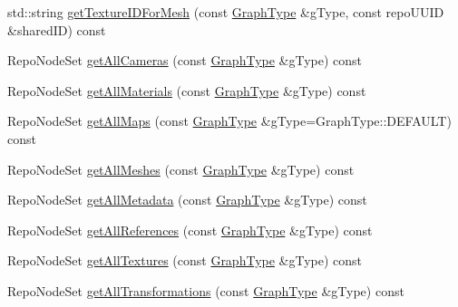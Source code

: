 \begin{DoxyCompactItemize}
std\+::string \hyperlink{classrepo_1_1core_1_1model_1_1_repo_scene_a781f11c7e9f9e561772581fbc8ecd51f}{get\+Texture\+I\+D\+For\+Mesh} (const \hyperlink{classrepo_1_1core_1_1model_1_1_repo_scene_aefcacd6eb4c7774ac1bfe3a6b223337c}{Graph\+Type} \&g\+Type, const repo\+U\+U\+I\+D \&shared\+I\+D) const 
\item 
Repo\+Node\+Set \hyperlink{classrepo_1_1core_1_1model_1_1_repo_scene_a22211b64fc734e3ad198fc3a3ba9cb8c}{get\+All\+Cameras} (const \hyperlink{classrepo_1_1core_1_1model_1_1_repo_scene_aefcacd6eb4c7774ac1bfe3a6b223337c}{Graph\+Type} \&g\+Type) const 
\item 
Repo\+Node\+Set \hyperlink{classrepo_1_1core_1_1model_1_1_repo_scene_adabb0d805be8ec6d7434503ca30d5190}{get\+All\+Materials} (const \hyperlink{classrepo_1_1core_1_1model_1_1_repo_scene_aefcacd6eb4c7774ac1bfe3a6b223337c}{Graph\+Type} \&g\+Type) const 
\item 
Repo\+Node\+Set \hyperlink{classrepo_1_1core_1_1model_1_1_repo_scene_a19e434c83664ce8495b6228d558abbe9}{get\+All\+Maps} (const \hyperlink{classrepo_1_1core_1_1model_1_1_repo_scene_aefcacd6eb4c7774ac1bfe3a6b223337c}{Graph\+Type} \&g\+Type=Graph\+Type\+::\+D\+E\+F\+A\+U\+L\+T) const 
\item 
Repo\+Node\+Set \hyperlink{classrepo_1_1core_1_1model_1_1_repo_scene_add6e2061525f8068419f8179b19ff67b}{get\+All\+Meshes} (const \hyperlink{classrepo_1_1core_1_1model_1_1_repo_scene_aefcacd6eb4c7774ac1bfe3a6b223337c}{Graph\+Type} \&g\+Type) const 
\item 
Repo\+Node\+Set \hyperlink{classrepo_1_1core_1_1model_1_1_repo_scene_a71138b088048664ef380a4b92c800570}{get\+All\+Metadata} (const \hyperlink{classrepo_1_1core_1_1model_1_1_repo_scene_aefcacd6eb4c7774ac1bfe3a6b223337c}{Graph\+Type} \&g\+Type) const 
\item 
Repo\+Node\+Set \hyperlink{classrepo_1_1core_1_1model_1_1_repo_scene_a6dafc1e4f714a1b01cf75609a8c273a2}{get\+All\+References} (const \hyperlink{classrepo_1_1core_1_1model_1_1_repo_scene_aefcacd6eb4c7774ac1bfe3a6b223337c}{Graph\+Type} \&g\+Type) const 
\item 
Repo\+Node\+Set \hyperlink{classrepo_1_1core_1_1model_1_1_repo_scene_a3278ebb3963f43cf1b978cf6cfa7e28a}{get\+All\+Textures} (const \hyperlink{classrepo_1_1core_1_1model_1_1_repo_scene_aefcacd6eb4c7774ac1bfe3a6b223337c}{Graph\+Type} \&g\+Type) const 
\item 
Repo\+Node\+Set \hyperlink{classrepo_1_1core_1_1model_1_1_repo_scene_a2f60a1976f3c0b26f48f88a2e9ea9532}{get\+All\+Transformations} (const \hyperlink{classrepo_1_1core_1_1model_1_1_repo_scene_aefcacd6eb4c7774ac1bfe3a6b223337c}{Graph\+Type} \&g\+Type) const 

\end{DoxyCompactItemize}
